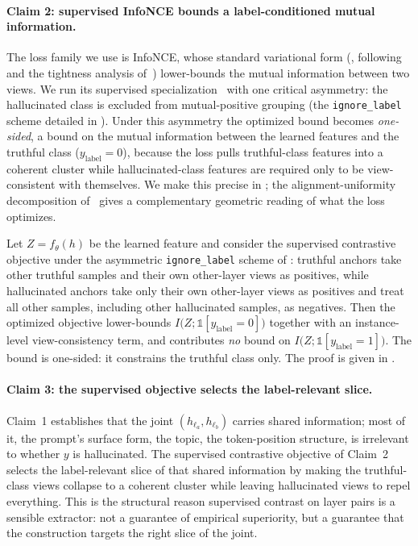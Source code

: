 \paragraph{Claim 2: supervised InfoNCE bounds a label-conditioned mutual information.}
The loss family we use is InfoNCE, whose standard variational form
(, following~\citet{oord2018representation} and the
tightness analysis of~\citet{poole2019variational}) lower-bounds the mutual
information between two views. We run its supervised
specialization~\citep{khosla2020supervised} with one critical asymmetry: the
hallucinated class is excluded from mutual-positive grouping (the
\texttt{ignore\_label} scheme detailed in ). Under this
asymmetry the optimized bound becomes \emph{one-sided}, a bound on the mutual
information between the learned features and the truthful class
($y_{\mathrm{label}} = 0$), because the loss pulls truthful-class features into a
coherent cluster while hallucinated-class features are required only to be
view-consistent with themselves. We make this precise in
; the alignment-uniformity decomposition
of~\citet{wang2021understanding} gives a complementary geometric reading of what
the loss optimizes.

\begin{proposition}\label{prop:hd:supcon-mi}
Let $Z = f_\theta(h)$ be the learned feature and consider the supervised
contrastive objective under the asymmetric \texttt{ignore\_label} scheme of
: truthful anchors take other truthful samples and their
own other-layer views as positives, while hallucinated anchors take only their
own other-layer views as positives and treat all other samples, including other
hallucinated samples, as negatives. Then the optimized objective lower-bounds
$I\bigl(Z; \mathbb{1}[y_{\mathrm{label}} = 0]\bigr)$ together with an
instance-level view-consistency term, and contributes \emph{no} bound on
$I\bigl(Z; \mathbb{1}[y_{\mathrm{label}} = 1]\bigr)$. The bound is one-sided: it
constrains the truthful class only. The proof is given in
.
\end{proposition}

\paragraph{Claim 3: the supervised objective selects the label-relevant slice.}
Claim~1 establishes that the joint $(h_{\ell_a}, h_{\ell_b})$ carries shared
information; most of it, the prompt's surface form, the topic, the
token-position structure, is irrelevant to whether $y$ is hallucinated. The
supervised contrastive objective of Claim~2 selects the label-relevant slice of
that shared information by making the truthful-class views collapse to a coherent
cluster while leaving hallucinated views to repel everything. This is the
structural reason supervised contrast on layer pairs is a sensible extractor: not
a guarantee of empirical superiority, but a guarantee that the construction
targets the right slice of the joint.

